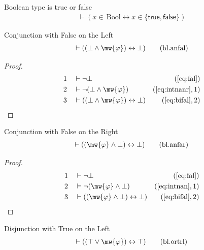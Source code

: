 
\begin{metadefinition} Boolean type is true or false
\begin{align}
\vdash ( x \in \,\mathrm{Bool} \leftrightarrow x \in \{ \mathsf{true} ,
    \mathsf{false} \} )\label{eq:df-bl.bool}\tag{df-bl.bool}
\end{align}
\end{metadefinition}

\begin{lemma} Conjunction with False on the Left
\begin{align}
\vdash ( ( \bot \wedge \mw{\varphi} ) \leftrightarrow \bot
    )\label{eq:bl.anfal}\tag{bl.anfal}
\end{align}
\end{lemma}

\begin{proof}
\begin{align}
  1 &&  & \vdash \lnot \bot&(\mbox{\ref{eq:fal}})\notag
  \\ 2 &&  & \vdash \lnot ( \bot \wedge \mw{\varphi} )&(\mbox{\ref{eq:intnanr}},1)\notag
  \\ 3 &&  & \vdash ( ( \bot \wedge \mw{\varphi} ) \leftrightarrow \bot )&(\mbox{\ref{eq:bifal}},2)\notag
\end{align}
\end{proof}

\begin{lemma} Conjunction with False on the Right
\begin{align}
\vdash ( ( \mw{\varphi} \wedge \bot ) \leftrightarrow \bot
    )\label{eq:bl.anfar}\tag{bl.anfar}
\end{align}
\end{lemma}

\begin{proof}
\begin{align}
  1 &&  & \vdash \lnot \bot&(\mbox{\ref{eq:fal}})\notag
  \\ 2 &&  & \vdash \lnot ( \mw{\varphi} \wedge \bot )&(\mbox{\ref{eq:intnan}},1)\notag
  \\ 3 &&  & \vdash ( ( \mw{\varphi} \wedge \bot ) \leftrightarrow \bot )&(\mbox{\ref{eq:bifal}},2)\notag
\end{align}
\end{proof}

\begin{lemma} Disjunction with True on the Left
\begin{align}
\vdash ( ( \top \vee \mw{\varphi} ) \leftrightarrow \top
    )\label{eq:bl.ortrl}\tag{bl.ortrl}
\end{align}
\end{lemma}

